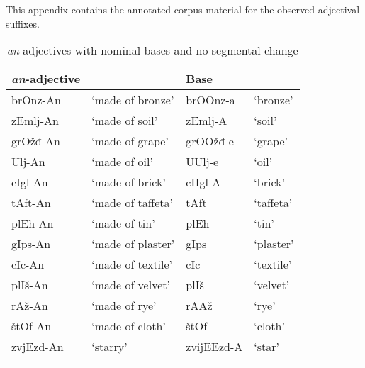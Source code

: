 \documentclass[output=paper]{langsci/langscibook}
\begin{document}
This appendix contains the annotated corpus material for the observed adjectival suffixes.

\begin{table}[h]
\caption{\textit{an}-adjectives with nominal bases and no segmental change}
\label{tabapp1}
 \begin{tabular}{ l l l l}
\lsptoprule  
\textit{an}-adjective &  & Base & 
\\ 
\hline
brOnz-An & `made of bronze' & brOOnz-a & `bronze'\\
zEmlj-An & `made of soil' & zEmlj-A & `soil'\\
grOžđ-An & `made of grape' & grOOžđ-e & `grape' \\
Ulj-An & `made of oil' & UUlj-e & `oil' \\
cIgl-An & `made of brick' & cIIgl-A & `brick' \\
tAft-An & `made of taffeta' & tAft & `taffeta'\\
plEh-An & `made of tin' & plEh & `tin'\\
gIps-An & `made of plaster' & gIps & `plaster'\\
cIc-An & `made of textile' & cIc & `textile' \\ 
plIš-An & `made of velvet' & plIš & `velvet'\\
rAž-An & `made of rye' & rAAž & `rye'\\
štOf-An & `made of cloth' & štOf & `cloth'\\
zvjEzd-An & `starry' & zvijEEzd-A & `star'\\
 \lspbottomrule
 \end{tabular}
\end{table} 
\end{document}
